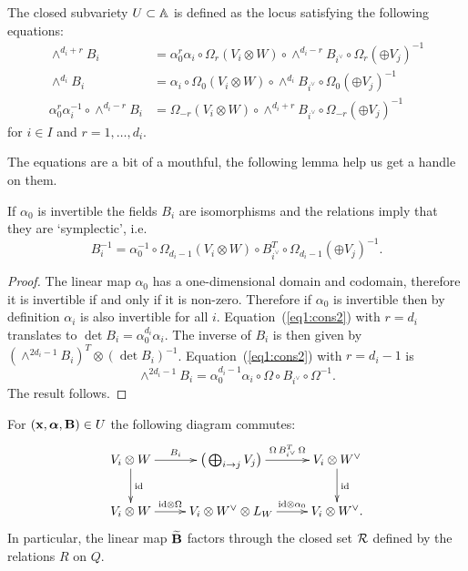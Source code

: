 \documentclass{amsart}
\newcommand{\balpha}{\boldsymbol{\alpha}}
\theoremstyle{definition}
\begin{document}
\begin{definition}\label{def:equa}
The closed subvariety $U \subset \mathbb{A}$ is defined as the locus satisfying the following equations:
\begin{align}
    \wedge^{d_i+r} B_i &= \alpha_0^r \alpha_i \circ \Omega_r(V_i \otimes W) \circ \wedge^{d_i-r} B_{i^\vee} \circ \Omega_r(\oplus V_j)^{-1}  \label{eq1:cons2} \\
    \wedge^{d_i} B_i &= \alpha_i \circ \Omega_{0}(V_i \otimes W) \circ \wedge^{d_i} B_{i^\vee} \circ \Omega_{0}(\oplus V_j)^{-1} \label{eq2:cons2} \\
    \alpha_0^r \alpha_i^{-1} \circ \wedge^{d_i-r} B_i &= \Omega_{-r}(V_i \otimes W) \circ \wedge^{d_i+r} B_{i^\vee} \circ \Omega_{-r}(\oplus V_j)^{-1} \label{eq3:cons2} 
\end{align}
for $i\in I$ and $r=1,\ldots,d_i$.
\end{definition}

The equations are a bit of a mouthful, the following lemma help us get a handle on them.

\begin{lemma}\label{lem:symp}
If $\alpha_0$ is invertible the fields $B_i$ are isomorphisms and the relations imply that they are `symplectic', i.e.
$$B_i^{-1} = \alpha_0^{-1} \circ \Omega_{d_i-1}(V_i \otimes W) \circ B_{i^\vee}^T \circ \Omega_{d_i-1}(\oplus V_j)^{-1}.$$
\end{lemma}

\begin{proof}
The linear map $\alpha_0$ has a one-dimensional domain and codomain, therefore it is invertible if and only if it is non-zero.
Therefore if $\alpha_0$ is invertible then by definition $\alpha_i$ is also invertible for all $i$.
Equation~(\ref{eq1:cons2}) with $r=d_i$ translates to $\det B_i= \alpha_0^{d_i} \alpha_i$.
The inverse of $B_i$ is then given by $(\wedge^{2d_i-1}B_i)^T \otimes (\det B_i)^{-1}$.
Equation~(\ref{eq1:cons2}) with $r=d_i-1$ is $$\wedge^{2d_i-1} B_i = \alpha_0^{d_i-1} \alpha_i \circ \Omega \circ B_{i^\vee} \circ \Omega^{-1}.$$
The result follows.
\end{proof}

\begin{lemma}\label{lem:rela}
For $(\bfx, \balpha, \bfB) \in U$ the following diagram commutes:
\begin{equation}\label{eq:comdiag}
    \xymatrix{V_i \otimes W \ar[r]^-{B_i} \ar[d]^{\textup{id}} & \big(\bigoplus_{i \rightarrow j}  V_j\big) \ar[r]^-{\Omega\,B_{i^\vee}^T \, \Omega} & V_i \otimes W^\vee \ar[d]^{\textup{id}} \\
    V_i \otimes W \ar[r]^-{\textup{id} \otimes \Omega} & V_i \otimes W^\vee \otimes L_W \ar[r]^-{\textup{id} \otimes \alpha_0} & V_i \otimes W^\vee.}
\end{equation}
In particular, the linear map $\widetilde{\mathbf{B}}$ factors through the closed set $\mathcal{R}$ defined by the relations $R$ on $Q$.
\end{lemma}
\end{document}
